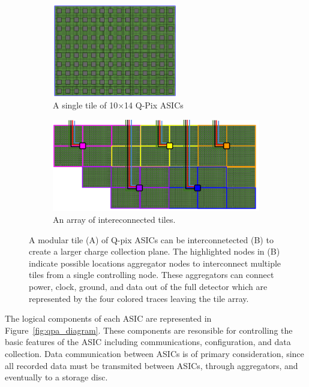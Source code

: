 \begin{figure}
\centering
\begin{subfigure}{.5\textwidth}
  \centering
  \includegraphics[width=0.6\textwidth]{images/single_tile_qpix.png}
  \caption{A single tile of 10$\times$14 Q-Pix ASICs}
\end{subfigure}%
\begin{subfigure}{.5\textwidth}
  \centering
  \includegraphics[width=\textwidth]{images/array_of_tiles_qpix.png}
  \caption{An array of intereconnected tiles.}
\end{subfigure}
\caption{A modular tile (A) of Q-pix ASICs can be interconnetected (B) to create a larger charge collection plane. 
The highlighted nodes in (B) indicate possible locations aggregator nodes to interconnect multiple tiles from a single controlling node.
These aggregators can connect power, clock, ground, and data out of the full detector which are represented by the four colored traces leaving the tile array.
}
\label{fig:qpix_tile_introduction}
\end{figure}

The logical components of each ASIC are represented in Figure~\ref{fig:qpa_diagram}.
These components are resonsible for controlling the basic features of the ASIC including communications, configuration, and data collection.
Data communication between ASICs is of primary consideration, since all recorded data must be transmited between ASICs, through aggregators, and eventually to a storage disc.

